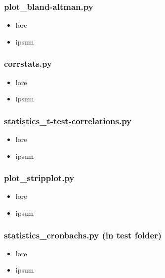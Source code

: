 \subsubsection{plot\_bland-altman.py}
\begin{itemize}

\item lore

\item ipsum

\end{itemize}


\subsubsection{corrstats.py}
\begin{itemize}

\item lore

\item ipsum

\end{itemize}


\subsubsection{statistics\_t-test-correlations.py}
\begin{itemize}

\item lore

\item ipsum

\end{itemize}


\subsubsection{plot\_stripplot.py}
\begin{itemize}

\item lore

\item ipsum

\end{itemize}


\subsubsection{statistics\_cronbachs.py (in test folder)}
\begin{itemize}

\item lore

\item ipsum

\end{itemize}


